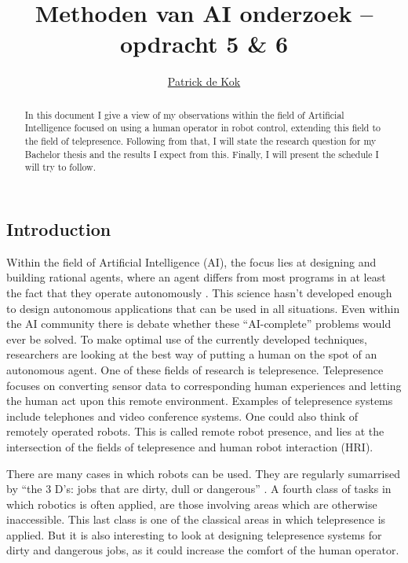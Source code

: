 \documentclass[10pt, a4paper]{article}
\author{\href{mailto:pkok@science.uva.nl}{Patrick de Kok}}
\title{Methoden van AI onderzoek -- opdracht 5 \& 6}
\begin{document}
\maketitle
\begin{abstract}
In this document I give a view of my observations within the field of
Artificial Intelligence focused on using a human operator in robot control,
extending this field to the field of telepresence. Following from that, I will
state the research question for my Bachelor thesis and the results I expect
from this. Finally, I will present the schedule I will try to follow.
\end{abstract}

\begin{multicols}{2}
\section{Introduction}
Within the field of Artificial Intelligence (AI), the focus lies at designing
and building rational agents, where an agent differs from most programs in at
least the fact that they operate autonomously \cite[p.4]{Russel2003}.  This
science hasn't developed enough to design autonomous applications that can be
used in all situations.  Even within the AI community there is debate whether
these ``AI-complete'' problems \cite[p.738]{Jurafsky2000} would ever be
solved.  To make optimal use of the currently developed techniques,
researchers are looking at the best way of putting a human on the spot of an
autonomous agent.  One of these fields of research is telepresence.
Telepresence focuses on converting sensor data to corresponding human
experiences and letting the human act upon this remote environment.  Examples
of telepresence systems include telephones and video conference systems. One
could also think of remotely operated robots.  This is called remote robot
presence, and lies at the intersection of the fields of telepresence and human
robot interaction (HRI).

There are many cases in which robots can be used. They are regularly
sumarrised by ``the 3 D's: jobs that are dirty, dull or dangerous''
\cite[p.6]{Murphy2000}.  A fourth class of tasks in which robotics is often
applied, are those involving areas which are otherwise inaccessible. This last
class is one of the classical areas in which telepresence is applied.  But it
is also interesting to look at designing telepresence systems for dirty
and dangerous jobs, as it could increase the comfort of the human operator.


\end{multicols}
\end{document}
